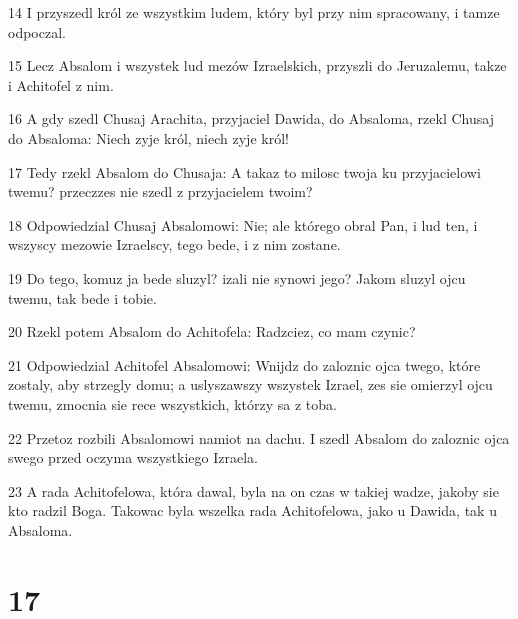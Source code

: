 \par 14 I przyszedl król ze wszystkim ludem, który byl przy nim spracowany, i tamze odpoczal.
\par 15 Lecz Absalom i wszystek lud mezów Izraelskich, przyszli do Jeruzalemu, takze i Achitofel z nim.
\par 16 A gdy szedl Chusaj Arachita, przyjaciel Dawida, do Absaloma, rzekl Chusaj do Absaloma: Niech zyje król, niech zyje król!
\par 17 Tedy rzekl Absalom do Chusaja: A takaz to milosc twoja ku przyjacielowi twemu? przeczzes nie szedl z przyjacielem twoim?
\par 18 Odpowiedzial Chusaj Absalomowi: Nie; ale którego obral Pan, i lud ten, i wszyscy mezowie Izraelscy, tego bede, i z nim zostane.
\par 19 Do tego, komuz ja bede sluzyl? izali nie synowi jego? Jakom sluzyl ojcu twemu, tak bede i tobie.
\par 20 Rzekl potem Absalom do Achitofela: Radzciez, co mam czynic?
\par 21 Odpowiedzial Achitofel Absalomowi: Wnijdz do zaloznic ojca twego, które zostaly, aby strzegly domu; a uslyszawszy wszystek Izrael, zes sie omierzyl ojcu twemu, zmocnia sie rece wszystkich, którzy sa z toba.
\par 22 Przetoz rozbili Absalomowi namiot na dachu. I szedl Absalom do zaloznic ojca swego przed oczyma wszystkiego Izraela.
\par 23 A rada Achitofelowa, która dawal, byla na on czas w takiej wadze, jakoby sie kto radzil Boga. Takowac byla wszelka rada Achitofelowa, jako u Dawida, tak u Absaloma.

\chapter{17}

